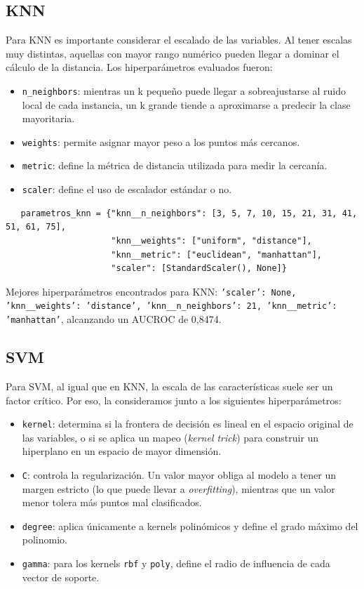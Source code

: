 \documentclass[10pt,a4paper]{article}
\begin{document}
\subsection{KNN}
Para KNN es importante considerar el escalado de las variables. Al tener escalas muy distintas, aquellas con mayor rango numérico pueden llegar a dominar el cálculo de la distancia. Los hiperparámetros evaluados fueron:

\begin{itemize}
   \item \texttt{n\_neighbors}: mientras un k pequeño puede llegar a sobreajustarse al ruido local de cada instancia, un k grande tiende a aproximarse a predecir la clase mayoritaria.
   \item \texttt{weights}: permite asignar mayor peso a los puntos más cercanos.
   \item \texttt{metric}: define la métrica de distancia utilizada para medir la cercanía.
   \item \texttt{scaler}: define el uso de escalador estándar o no.
\end{itemize}

\begin{lstlisting}
   parametros_knn = {"knn__n_neighbors": [3, 5, 7, 10, 15, 21, 31, 41, 51, 61, 75],
                     "knn__weights": ["uniform", "distance"], 
                     "knn__metric": ["euclidean", "manhattan"], 
                     "scaler": [StandardScaler(), None]}  
\end{lstlisting}

Mejores hiperparámetros encontrados para KNN: \texttt{'scaler': None, 'knn\_\_weights': 'distance', 'knn\_\_n\_neighbors': 21, 'knn\_\_metric': 'manhattan'}, alcanzando un AUCROC de 0,8474.

\subsection{SVM}
Para SVM, al igual que en KNN, la escala de las características suele ser un factor crítico. Por eso, la consideramos junto a los siguientes hiperparámetros:

\begin{itemize}
   \item \texttt{kernel}: determina si la frontera de decisión es lineal en el espacio original de las variables, o si se aplica un mapeo (\textit{kernel trick}) para construir un hiperplano en un espacio de mayor dimensión.
   \item \texttt{C}: controla la regularización. Un valor mayor obliga al modelo a tener un margen estricto (lo que puede llevar a \textit{overfitting}), mientras que un valor menor tolera más puntos mal clasificados.
   \item \texttt{degree}: aplica únicamente a kernels polinómicos y define el grado máximo del polinomio.
   \item \texttt{gamma}: para los kernels \texttt{rbf} y \texttt{poly}, define el radio de influencia de cada vector de soporte.
\end{itemize}
\end{document}
